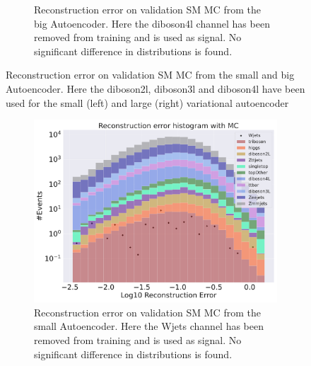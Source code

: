\begin{figure}[H]
\begin{subfigure}{.45\textwidth}
        \caption{Reconstruction error on validation SM MC from the big Autoencoder. Here the diboson4l channel has been removed from training and 
        is used as signal. No significant difference in distributions is found. }
        \label{fig:vae_big_diboson4l}
    \end{subfigure}
    \hfill  
    \caption[VAE | Channel removal, diboson2l, diboson3l, diboson4l]{Reconstruction error on validation SM MC from the small and big Autoencoder. 
    Here the diboson2l, diboson3l and diboson4l have been used for the small (left) and large (right) variational autoencoder}
    \label{fig:vae_big_channel3}
\end{figure}


\begin{figure}[H]
    \centering
    \begin{subfigure}{.45\textwidth}
        \includegraphics[width=\textwidth]{Figures/VAE_testing/small/b_data_recon_big_rm3_feats_sig_Wjets.pdf}
        \caption{Reconstruction error on validation SM MC from the small Autoencoder. Here the Wjets channel has been removed from training and 
        is used as signal. No significant difference in distributions is found.}
        \label{fig:vae_small_Wjets}
    \end{subfigure}
    \hfill 
    \begin{subfigure}{.45\textwidth}

\end{subfigure}
\end{figure}
